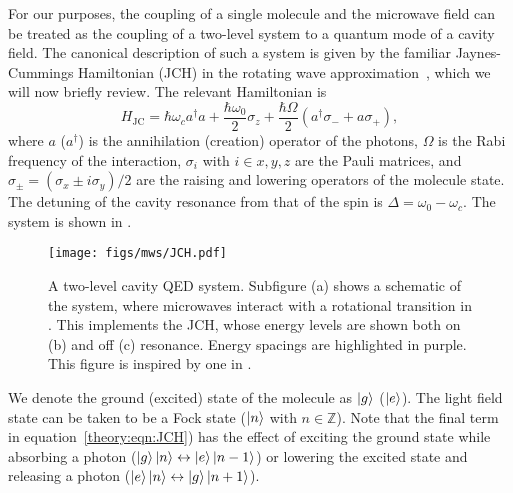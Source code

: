 For our purposes, the coupling of a single molecule and the microwave field can
be treated as the coupling of a two-level system to a quantum mode of a cavity
field. The canonical description of such a system is given by the familiar
Jaynes-Cummings Hamiltonian (JCH) in the rotating wave
approximation~\cite{gerry_knight_2004}, which we will now briefly review. The
relevant Hamiltonian is
%
\begin{equation}
  H_\text{JC} = \hbar\omega_c a^\dagger a + \frac{\hbar \omega_0}{2} \sigma_z +
  \frac{\hbar\Omega}{2}(a^\dagger \sigma_- + a\sigma_+),
  \label{theory:eqn:JCH}
\end{equation}
%
where $a$ ($a^\dagger$) is the annihilation (creation) operator of the photons,
$\Omega$ is the Rabi frequency of the interaction, $\sigma_i$ with $i\in{x, y,
z}$ are the Pauli matrices, and $\sigma_\pm = (\sigma_x \pm i\sigma_y)/2$ are
the raising and lowering operators of the molecule state. The detuning of the
cavity resonance from that of the spin is $\Delta = \omega_0 - \omega_c$. The
system is shown in .

\begin{figure}
  \texttt{[image: figs/mws/JCH.pdf]}
  \caption[Two-lvel cavity QED system]{
    A two-level cavity QED system. Subfigure (a) shows a schematic of
    the system, where microwaves interact with a rotational transition in
    \CaF{}. This implements the JCH, whose energy levels are shown both on (b)
    and off (c) resonance. Energy spacings are highlighted in purple. This
    figure is inspired by one in .
  }
  \label{theory:fig:JCHstates}
\end{figure}

We denote the ground (excited) state of the molecule as $\ket{g}$ ($\ket{e}$).
The light field state can be taken to be a Fock state ($\ket{n}$ with $n \in
\mathbb{Z}$). Note that the final term in equation~\ref{theory:eqn:JCH}) has
the effect of exciting the ground state while absorbing a photon
($\ket{g}\ket{n} \leftrightarrow \ket{e}\ket{n-1}$) or lowering the excited state
and releasing a photon ($\ket{e}\ket{n} \leftrightarrow \ket{g}\ket{n+1}$).

